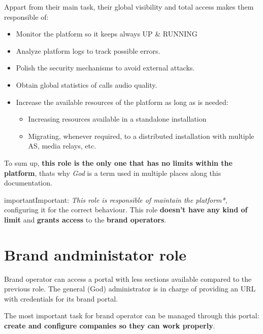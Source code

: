 \documentclass[letterpaper,10pt,english]{sphinxmanual}
\begin{document}
Appart from their main task, their global visibility and total access
makes them responsible of:
\begin{itemize}
\item {} 
Monitor the platform so it keeps always UP \& RUNNING

\item {} 
Analyze platform logs to track possible errors.

\item {} 
Polish the security mechanisms to avoid external attacks.

\item {} 
Obtain global statistics of calls audio quality.

\item {} 
Increase the available resources of the platform as long as is needed:
\begin{itemize}
\item {} 
Increasing resources available in a standalone installation

\item {} 
Migrating, whenever required, to a distributed installation with multiple
AS, media relays, etc.

\end{itemize}

\end{itemize}

To sum up, \textbf{this role is the only one that has no limits within the
platform}, thats why \emph{God} is a term used in multiple places along this
documentation.

\begin{notice}{important}{Important:}
\emph{This role is responsible of maintain the platform*}, configuring
it for the correct behaviour. This role \textbf{doesn't have any kind
of limit} and \textbf{grants access} to the \textbf{brand operators}.
\end{notice}


\section{Brand andministator role}
\label{basics/operation_roles/index:brand-andministator-role}
Brand operator can access a portal with less sections available compared
to the previous role. The general (God) administrator is in charge of
providing an URL with credentials for its brand portal.

The most important task for brand operator can be managed through this
portal: \textbf{create and configure companies so they can work properly}.
\end{document}
